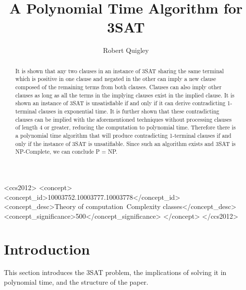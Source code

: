 \documentclass[manuscript]{acmart}
\begin{document}
    \title{A Polynomial Time Algorithm for 3SAT} 
    \author{Robert Quigley}

    \begin{abstract}
        It is shown that any two clauses in an instance of 3SAT sharing the same terminal which is positive in one clause and negated in the other can imply a new clause composed of the remaining terms from both clauses. Clauses can also imply other clauses as long as all the terms in the implying clauses exist in the implied clause. It is shown an instance of 3SAT is unsatisfiable if and only if it can derive contradicting 1-terminal clauses in exponential time. It is further shown that these contradicting clauses can be implied with the aforementioned techniques without processing clauses of length 4 or greater, reducing the computation to polynomial time. Therefore there is a polynomial time algorithm that will produce contradicting 1-terminal clauses if and only if the instance of 3SAT is unsatifiable. Since such an algorithm exists and 3SAT is NP-Complete, we can conclude P = NP.
    \end{abstract}
    
    
\begin{CCSXML}
        <ccs2012>
           <concept>
               <concept_id>10003752.10003777.10003778</concept_id>
               <concept_desc>Theory of computation~Complexity classes</concept_desc>
               <concept_significance>500</concept_significance>
               </concept>
        </ccs2012>
\end{CCSXML}
        
    
    \maketitle 
    
    \section{Introduction}

        This section introduces the 3SAT problem, the implications of
        solving it in polynomial time, and the structure of the paper.
\end{document}
